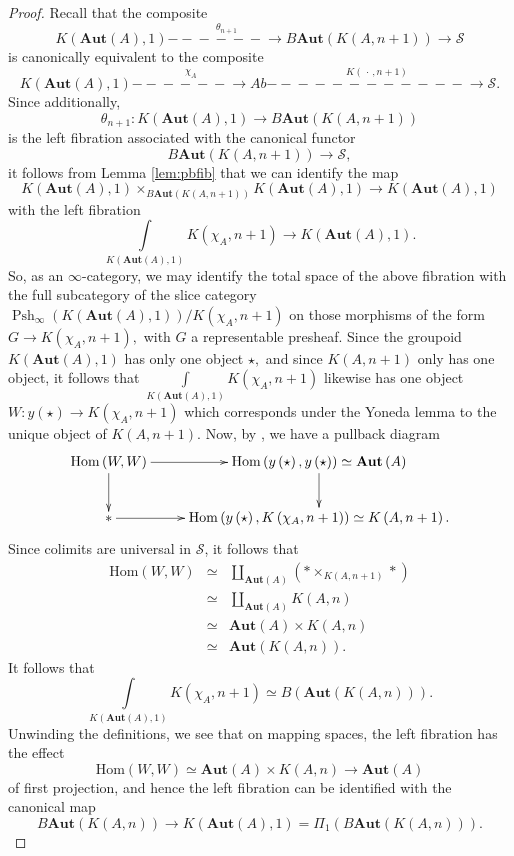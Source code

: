 \documentclass[12pt]{amsart}
\theoremstyle{definition}
\newcommand{\cS}{\mathcal{S}}
\newcommand{\Hom}{\mathrm{Hom}}
\renewcommand{\i}{\infty}
\def\Pshi{\operatorname{Psh}_\i}
\def\blank{\mspace{3mu}\cdot\mspace{3mu}}
\def\Aut{\mathbf{Aut}}
\def\longlongrightarrow{-\!\!\!-\!\!\!-\!\!\!-\!\!\!-\!\!\!-\!\!\!\longrightarrow}
\def\longlonglongrightarrow{-\!\!\!-\!\!\!-\!\!\!-\!\!\!-\!\!\!-\!\!\!\longlongrightarrow}
\begin{document}
\begin{proof}
Recall that the composite $$K\left(\Aut\left(A\right),1\right) \stackrel{\theta_{n+1}}{\longlongrightarrow} B\Aut\left(K\left(A,n+1\right)\right) \to \cS$$ is canonically equivalent to the composite
$$K\left(\Aut\left(A\right),1\right) \stackrel{\chi_A}{\longlongrightarrow} Ab \stackrel{K\left(\blank,n+1\right)}{\longlonglongrightarrow} \cS.$$ Since additionally, $$\theta_{n+1}:K\left(\Aut\left(A\right),1\right) \to B\Aut\left(K\left(A,n+1\right)\right)$$ is the left fibration associated with the canonical functor $$B\Aut\left(K\left(A,n+1\right)\right) \to \cS,$$ it follows from Lemma \ref{lem:pbfib} that we can identify the map $$K\left(\Aut\left(A\right),1\right)  \times_{B\Aut\left(K\left(A,n+1\right)\right)} K\left(\Aut\left(A\right),1\right) \to K\left(\Aut\left(A\right),1\right)$$ with the left fibration
$$\underset{K\left(\Aut\left(A\right),1\right)}\int \!\!\!\!\!\!\!\!\!\! K\left(\chi_A,n+1\right) \longrightarrow K\left(\Aut\left(A\right),1\right).$$ So, as an $\i$-category, we may identify the total space of the above fibration with the full subcategory of the slice category $\Pshi\left(K\left(\Aut\left(A\right),1\right)\right)/K\left(\chi_A,n+1\right)$ on those morphisms of the form $G \to K\left(\chi_A,n+1\right),$ with $G$ a representable presheaf. Since the groupoid $K\left(\Aut\left(A\right),1\right)$ has only one object $\star,$ and since $K\left(A,n+1\right)$ only has one object, it follows that $\underset{K\left(\Aut\left(A\right),1\right)}\int \!\!\!\!\!\!\!\!\!\! K\left(\chi_A,n+1\right)$ likewise has one object $W:y\left(\star\right) \to K\left(\chi_A,n+1\right)$ which corresponds under the Yoneda lemma to the unique object of $K\left(A,n+1\right).$ Now, by \cite[Proposition 5.5.5.12]{htt}, we have a pullback diagram
$$\xymatrix{\Hom\left(W,W\right) \ar[r] \ar[d] & \Hom\left(y\left(\star\right),y\left(\star\right)\right)\simeq \Aut\left(A\right) \ar[d]\\
\ast \ar[r] & \Hom\left(y\left(\star\right),K\left(\chi_A,n+1\right)\right)\simeq K\left(A,n+1\right).}$$
Since colimits are universal in $\cS$, it follows that
\begin{eqnarray*}
\Hom\left(W,W\right) &\simeq & \underset{\Aut\left(A\right)} \coprod \left(* \times_{K\left(A,n+1\right)} *\right)\\
&\simeq &  \underset{\Aut\left(A\right)} \coprod K\left(A,n\right)\\
&\simeq & \Aut\left(A\right) \times K\left(A,n\right)\\
&\simeq & \Aut\left(K\left(A,n\right)\right).
\end{eqnarray*}
It follows that 
$$\underset{K\left(\Aut\left(A\right),1\right)}\int \!\!\!\!\!\!\!\!\!\! K\left(\chi_A,n+1\right) \simeq B\left(\Aut\left(K\left(A,n\right)\right)\right).$$
Unwinding the definitions, we see that on mapping spaces, the left fibration has the effect
$$\Hom\left(W,W\right)\simeq \Aut\left(A\right) \times K\left(A,n\right) \to \Aut\left(A\right)$$
of first projection, and hence the left fibration can be identified with the canonical map 
$$B\Aut\left(K\left(A,n\right)\right) \to K\left(\Aut\left(A\right),1\right) =\Pi_1\left(B\Aut\left(K\left(A,n\right)\right)\right).$$ 


\end{proof}
\end{document}
